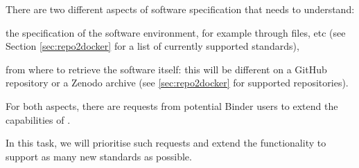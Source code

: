 \begin{task}[
  title=Support more software specification standards,
  id=buildpacks,
  lead=SRL,
  PM=12,
  partners={MP}
  ]

  There are two different aspects of software specification that \repotodocker{}
  needs to understand:
  \begin{compactitem}
  \item the specification of the software environment, for example through
     files, etc (see Section
    \ref{sec:repo2docker} for a list of currently
    supported standards),
  \item from where to retrieve the software itself: this will be different on a
    GitHub repository or a Zenodo archive
    (see \ref{sec:repo2docker} for supported repositories).
  \end{compactitem}

  For both aspects, there are requests from potential Binder users to extend the
  capabilities of \repotodocker{}.

  In this task, we will prioritise such requests and extend the \repotodocker{}
  functionality to support as many new standards as possible.

\end{task}
